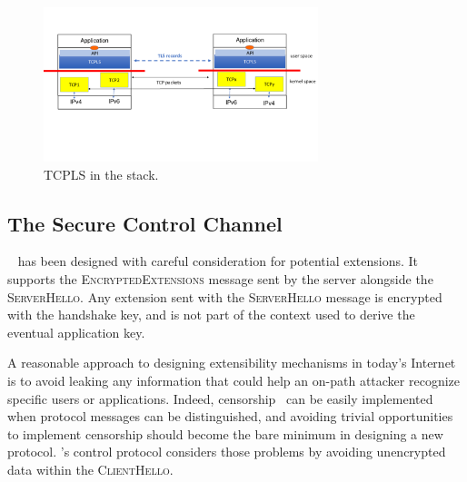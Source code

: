 
\begin{figure}[!t]
  \begin{center}
      \vspace{-1.5cm}
    \includegraphics[width=8cm]{figures/tcpls-fig2.pdf}
  \end{center}
  \vspace{-1.5cm}
  \caption{TCPLS in the stack.}
  \label{fig:arch}
    \vspace{-0.5cm}
\end{figure}



\subsection{The Secure Control Channel}\label{sec:extending}

~\cite{rfc8446} has been designed with careful consideration for
potential extensions. It supports the \textsc{EncryptedExtensions} message sent by the server alongside the \textsc{ServerHello}. Any extension sent with the \textsc{ServerHello} message is encrypted with the handshake key, and is not part of the context used to derive the eventual application key.

A reasonable approach to designing extensibility mechanisms in today's Internet is to avoid leaking any information that could help an on-path attacker recognize specific users or applications. Indeed, censorship~\cite{Morshed2017a, Gosain2017a,Chai2019a} can be easily implemented when protocol messages can be distinguished, and avoiding trivial opportunities to implement censorship should become the bare minimum in designing a new protocol. \tcpls's control protocol considers those problems by avoiding unencrypted data within the \textsc{ClientHello}.


